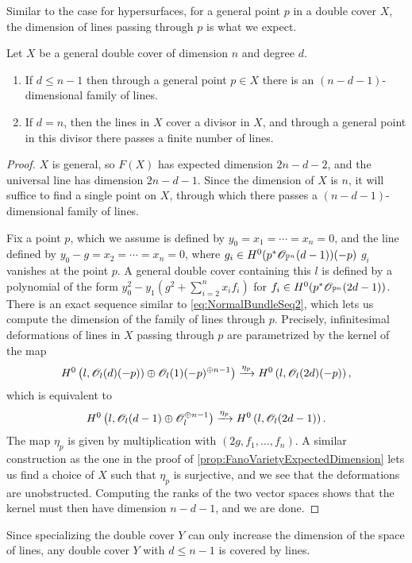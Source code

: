 Similar to the case for hypersurfaces, for a general point $p$ in a double cover $X$, the dimension of lines passing through $p$ is what we expect.
\begin{proposition}
	\label{prop:LinesThroughPoint}
  Let $X$ be a general double cover of dimension $n$ and degree $d$.
  \begin{enumerate}
  \item If $d \leq n-1$ then through a general point $p \in X$ there is an $(n-d-1)$-dimensional family of lines.
  \item If $d=n$, then the lines in $X$ cover a divisor in $X$, and through a general point in this divisor there passes a finite number of lines.
  \end{enumerate}
\end{proposition}
\begin{proof}
  $X$ is general, so $F(X)$ has expected dimension $2n-d-2$, and the universal line has dimension $2n-d-1$. Since the dimension of $X$ is $n$, it will suffice to find a single point on $X$, through which there passes a $(n-d-1)$-dimensional family of lines.

Fix a point $p$, which we assume is defined by $y_0=x_1=\cdots=x_n=0$, and the line defined by ${y_0-g = x_2 = \cdots = x_n = 0}$, where $g_i \in H^0(p^*\mathscr{O}_{\mathbb{P}^n}(d-1))(-p)$ \ie $g_i$ vanishes at the point $p$. A general double cover containing this $l$ is defined by a polynomial of the form $y_0^2 - y_1(g^2 + \sum_{i=2}^nx_if_i)$ for $f_i \in H^0(p^*\mathscr{O}_{\mathbb{P}^n}(2d-1))$. There is an exact sequence similar to \eqref{eq:NormalBundleSeq2}, which lets us compute the dimension of the family of lines through $p$. Precisely, infinitesimal deformations of lines in $X$ passing through $p$ are parametrized by the kernel of the map
\[
H^0\left(l,\mathscr{O}_l(d)(-p)) \oplus \mathscr{O}_l(1)(-p)^{\oplus n-1} \right) \xrightarrow{\eta_p} H^0\left(l,\mathscr{O}_l(2d)(-p)\right),
\]
which is equivalent to 
\begin{equation}
\label{eq:NormalBundleThroughPoint}
H^0\left(l,\mathscr{O}_l(d-1) \oplus \mathscr{O}_l^{\oplus n-1}\right) \xrightarrow{\eta_p} H^0\left(l,\mathscr{O}_l(2d-1)\right).
\end{equation}
The map $\eta_p$ is given by multiplication with $(2g,f_1,\dots,f_n)$. A similar construction as the one in the proof of \cref{prop:FanoVarietyExpectedDimension} lets us find a choice of $X$ such that $\eta_p$ is surjective, and we see that the deformations are unobstructed. Computing the ranks of the two vector spaces shows that the kernel must then have dimension $n-d-1$, and we are done.
\end{proof}
\begin{remark}
  \label{rem:LinesThroughPointAllDoubleCovers}
  Since specializing the double cover $Y$ can only increase the dimension of the space of lines, any double cover $Y$ with $d \leq n-1$ is covered by lines.
\end{remark}

